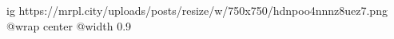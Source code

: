  
 
 
 
 

\ifcmt
  ig https://mrpl.city/uploads/posts/resize/w/750x750/hdnpoo4nnnz8uez7.png
  @wrap center
  @width 0.9
\fi
